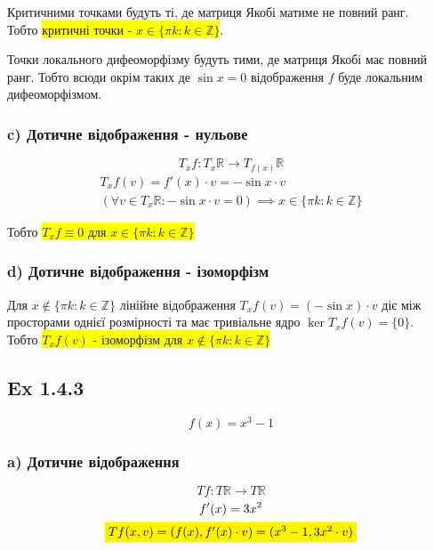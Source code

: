 \documentclass[10pt, a4paper]{article} %
\newcommand{\R}{\mathbb{R}}
\begin{document}
Критичними точками будуть ті, де матриця Якобі матиме не повний ранг.\\
Тобто \colorbox{yellow}{критичні точки - $x \in \{\pi k : k\in\mathbb Z\}$}.

Точки локального дифеоморфізму будуть тими, де матриця Якобі має повний ранг.
Тобто всюди окрім таких де $\sin x = 0$ відображення $f$ буде локальним дифеоморфізмом.

\subsubsection*{c) Дотичне відображення - нульове}
\[T_{x}f : T_{x}\R \to T_{f(x)}\R\]
\begin{gather*}
    T_{x}f(v) = f'(x) \cdot v = -\sin x \cdot v\\
    \left(\forall v\in T_{x}\R: -\sin x \cdot v = 0\right) \implies  x \in \{\pi k : k\in\mathbb Z\}
\end{gather*}

Тобто \colorbox{yellow}{$T_{x}f \equiv 0$ для $x \in \{\pi k : k\in\mathbb Z\}$}

\subsubsection*{d) Дотичне відображення - ізоморфізм}

Для $x \notin \{\pi k : k\in\mathbb Z\}$ лінійне відображення $T_{x}f(v) = (-\sin x) \cdot v$ діє між просторами однієї розмірності та має тривіальне ядро $\ker T_{x}f(v) = \{0\}$. \\
Тобто \colorbox{yellow}{$T_{x}f(v)$ - ізоморфізм для $x \notin \{\pi k : k\in\mathbb Z\}$}


\subsection*{Ex 1.4.3}
\begin{mdframed}
    \[f(x) = x^3 - 1\]
\end{mdframed}

\subsubsection*{a) Дотичне відображення}
\[Tf : T\R \to T\R\]
\begin{gather*}
    f'(x) = 3x^2\\
    \colorbox{yellow}{$Tf(x,v) = (f(x), f'(x)\cdot v) = (x^3-1, 3x^2 \cdot v)$}
\end{gather*}
\end{document}
